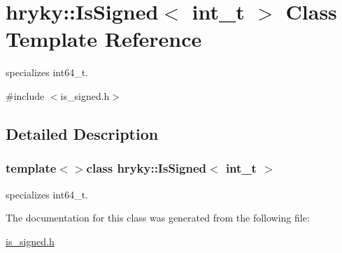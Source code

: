\hypertarget{classhryky_1_1_is_signed_3_01int__t_01_4}{\section{hryky\-:\-:Is\-Signed$<$ int\-\_\-t $>$ Class Template Reference}
\label{classhryky_1_1_is_signed_3_01int__t_01_4}
}


specializes int64\-\_\-t.  




{\ttfamily \#include $<$is\-\_\-signed.\-h$>$}



\subsection{Detailed Description}
\subsubsection*{template$<$$>$class hryky\-::\-Is\-Signed$<$ int\-\_\-t $>$}

specializes int64\-\_\-t. 

The documentation for this class was generated from the following file\-:\begin{DoxyCompactItemize}
\item 
\hyperlink{is__signed_8h}{is\-\_\-signed.\-h}\end{DoxyCompactItemize}
